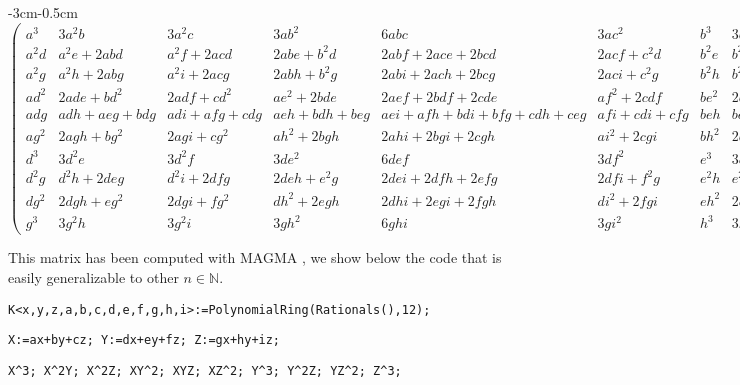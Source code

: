 \documentclass[a4paper,10pt]{amsart}
\theoremstyle{plain}
\theoremstyle{definition}
\theoremstyle{remark}
\numberwithin{equation}{section}
\begin{document}
\tiny
\begin{changemargin}{-3cm}{-0.5cm} 
$
\begin{pmatrix}
a^3 & 3a^2b & 3a^2c & 3ab^2 & 6abc & 3ac^2 & b^3 & 3b^2c & 3bc^2 & c^3 \\
a^2d & a^2e + 2abd & a^2f + 2acd & 2abe + b^2d &  2abf + 2ace + 2bcd & 2acf + c^2d & b^2e & b^2f + 2bce & 2bcf + c^2e & c^2f \\
a^2g & a^2h + 2abg & a^2i + 2acg & 2abh + b^2g &  2abi + 2ach + 2bcg &
2aci + c^2g & b^2h & b^2i + 2bch & 2bci + c^2h & c^2i \\
ad^2 & 2ade + bd^2 & 2adf + cd^2 & ae^2 + 2bde & 2aef + 2bdf + 2cde &
af^2 + 2cdf & be^2 & 2bef + ce^2 & bf^2 + 2cef & cf^2\\
adg & adh + aeg + bdg & adi + afg +cdg & aeh + bdh +beg & aei +
afh + bdi +bfg + cdh +ceg & afi +cdi + cfg & beh & bei +bfh + ceh & bfi + cei + cfh & cfi\\
ag^2 & 2agh + bg^2 & 2agi + cg^2 & ah^2 + 2bgh &  2ahi + 2bgi + 2cgh &
ai^2 + 2cgi & bh^2 & 2bhi + ch^2 & bi^2 + 2chi & ci^2\\
d^3 & 3d^2e & 3d^2f & 3de^2 &  6def & 3df^2 & e^3 & 3e^2f & 3ef^2 & f^3\\
d^2g & d^2h + 2deg & d^2i + 2dfg & 2deh + e^2g & 2dei + 2dfh + 2efg &
2dfi + f^2g & e^2h & e^2i + 2efh & 2efi + f^2h & f^2i\\
dg^2 & 2dgh + eg^2 & 2dgi + fg^2 & dh^2 + 2egh & 2dhi + 2egi + 2fgh & di^2 + 2fgi & eh^2 & 2ehi + fh^2 & ei^2 + 2fhi & fi^2\\
g^3 & 3g^2h & 3g^2i &  3gh^2 & 6ghi & 3gi^2 & h^3 & 3h^2i & 3hi^2 & i^3
\end{pmatrix}
$
\end{changemargin}

\normalsize

\vspace{0.5cm}

This matrix has been computed with MAGMA \cite{magma}, we show below the code that is easily generalizable to other $n\in\mathbb{N}$.

\vspace{0.5cm}

\texttt{K<x,y,z,a,b,c,d,e,f,g,h,i>:=PolynomialRing(Rationals(),12);}

\texttt{X:=ax+by+cz; Y:=dx+ey+fz; Z:=gx+hy+iz;}

\texttt{X^3; X^2Y; X^2Z; XY^2; XYZ; XZ^2; Y^3; Y^2Z; YZ^2; Z^3;}

\vspace{0.5cm}
\end{document}
